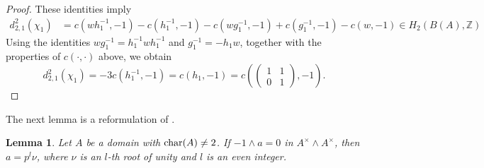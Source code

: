 \documentclass[11pt]{amsart}
\theoremstyle{definition}
\theoremstyle{plain}
\newtheorem{lem}[ntn]{Lemma}
\theoremstyle{definition}
\numberwithin{equation}{section}
\newcommand{\z}{\mathbb{Z}}
\newcommand{\GG}{\mathcal{G}}
\renewcommand{\SS}{\mathcal{S}}
\renewcommand{\aa}{{A^\times}}
\newcommand{\lan}{\langle}
\newcommand{\ran}{\rangle}
\renewcommand{\char}{{\rm char}}
\newcommand{\mtxx}[4]
{\left(\!\!
	\begin{array}{cc}
		\!\!#1 & \!\!#2\\
		\!\!#3 & \!\!#4
	\end{array}\!\!
	\right)}
\begin{document}
\begin{proof}
		These identities imply
		\begin{align*}
			d^2_{2,1}(\chi_1)&=c(wh_1^{-1},-1)-c(h_1^{-1},-1)-c(wg_1^{-1},-1)+c(g_1^{-1},-1)-c(w,-1)\in H_2(B(A),\z)
		\end{align*}
		Using the identities $wg_1^{-1}=h_1^{-1}wh_1^{-1}$ and $g_1^{-1}=-h_1w$, together with the properties of $c(\cdot,\cdot)$ above, we obtain
		\[
		d^2_{2,1}(\chi_1)=-3c(h^{-1}_1,-1)=c(h_1,-1)=c\left(\mtxx{1}{1}{0}{1},-1\right).
		\]
	\end{proof}
	The next lemma is a reformulation of \cite[Lemma 4.5]{B-E--2023}.
	\begin{lem}\label{ker-d-alpha}
		Let $A$ be a domain with $\char(A)\neq 2$. If $-1\wedge a=0$ in $\aa\wedge\aa$, then $a=p^l\nu$, where $\nu$ is an $l$-th root of unity and $l$ is an even integer.
	\end{lem}
\end{document}

